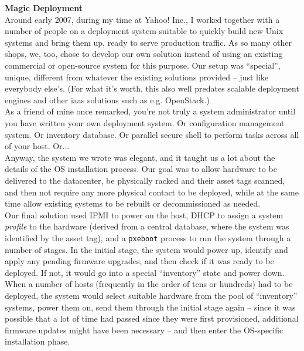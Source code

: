\begin{experience}
{\bf Magic Deployment} \\

Around early 2007, during my time at Yahoo! Inc., I
worked together with a number of people on a
deployment system suitable to quickly build new Unix
systems and bring them up, ready to serve production
traffic.  As so many other shops, we, too, chose to
develop our own solution instead of using an existing
commercial or open-source system for this purpose.
Our setup was ``special'', unique, different from
whatever the existing solutions provided -- just like
everybody else's. (For what it's worth, this also
well predates scalable deployment engines and other
\gls{iaas}
solutions such as e.g. OpenStack.) \\
[10pt]

As a friend of mine once remarked,
you're not truly a system administrator until you have
written your own deployment system. Or configuration
management system.  Or inventory database.  Or
parallel secure shell to perform tasks across all of
your host.  Or... \\ [10pt]

Anyway, the system we wrote was elegant, and it taught
us a lot about the details of the OS installation
process.  Our goal was to allow hardware to be
delivered to the datacenter, be physically racked and
their asset tags scanned, and then not require any
more physical contact to be deployed, while at the
same time allow existing systems to be rebuilt or
decommissioned as needed. \\ [10pt]

Our final solution used IPMI to power on
the host, DHCP to assign a system {\em
profile} to the hardware (derived from a central
database, where the system was identified by the asset
tag), and a {\tt pxeboot} process to
run the system through a number of stages.  In the
initial stage, the system would power up, identify and
apply any pending firmware upgrades, and then check if
it was ready to be deployed.  If not, it would go into
a special ``inventory'' state and power down. \\
[10pt]

When a number of hosts (frequently in the order of
tens or hundreds) had to be deployed, the system would
select suitable hardware from the pool of
``inventory'' systems, power them on, send them
through the initial stage again -- since it was
possible that a lot of time had passed since they were
first provisioned, additional firmware updates might
have been necessary -- and then enter the OS-specific
installation phase. \\ [10pt]


\end{experience}
